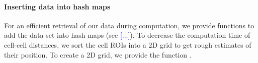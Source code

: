 \documentclass{report}
\begin{document}
%	
%		
%	
%	
%	
%	
%	
%	

\paragraph{Inserting data into hash maps} 
For an efficient retrieval of our data during computation, we provide functions to add the data set into hash maps (see \textcolor{blue}{[...]}). To decrease the computation time of cell-cell distances, we sort the cell ROIs into a 2D grid to get rough estimates of their position. To create a 2D grid, we provide the function . 

\end{document}
